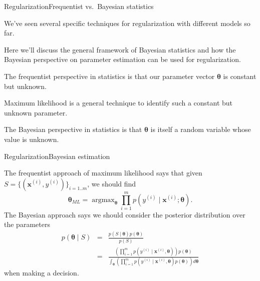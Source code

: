 \documentclass{beamer}
\renewcommand{\vec}[1]{\boldsymbol{#1}}
\DeclareMathOperator*{\argmax}{argmax}
\begin{document}
\begin{frame}{Regularization}{Frequentist vs.\ Bayesian statistics}

  We've seen several specific techniques for \alert{regularization}
  with different models so far.

  \medskip

  Here we'll discuss the general framework of Bayesian statistics and
  how the Bayesian perspective on parameter estimation can be used for
  regularization.

  \medskip

  The \alert{frequentist} perspective in statistics is that our
  parameter vector $\vec{\theta}$ is \alert{constant but unknown}.

  \medskip

  Maximum likelihood is a general technique to identify such a
  constant but unknown parameter.

  \medskip

  The \alert{Bayesian} perspective in statistics is that
  $\vec{\theta}$ is itself a \alert{random variable} whose value is
  unknown.
  
\end{frame}


\begin{frame}{Regularization}{Bayesian estimation}

  The frequentist approach of maximum likelihood says that given $S =
  \{ (\vec{x}^{(i)},y^{(i)})\}_{i=1..m}$, we should find
  \[ \vec{\theta}_{ML} = \argmax_{\vec{\theta}} \prod_{i=1}^m p(y^{(i)} \mid \vec{x}^{(i)}; \vec{\theta}) .\]
  The Bayesian approach says we should consider the \alert{posterior distribution over the parameters}
  \begin{eqnarray*}
    p(\vec{\theta} \mid S) & = & \frac{p(S \mid \vec{\theta}) p(\vec{\theta})}{p(S)} \\
    & = & \frac{\left(\prod_{i=1}^m p(y^{(i)}\mid \vec{x}^{(i)}, \vec{\theta})\right) p(\vec{\theta})}{\int_{\vec{\theta}}\left( \prod_{i=1}^m p(y^{(i)}\mid \vec{x}^{(i)},\vec{\theta}) p(\vec{\theta})\right) d\vec{\theta}}
  \end{eqnarray*}
  when making a decision.

\end{frame}
\end{document}
